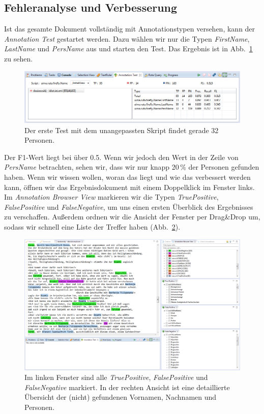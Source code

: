 \documentclass{article}
\begin{document}
\subsection{Fehleranalyse und Verbesserung}

Ist das gesamte Dokument vollständig mit Annotationstypen versehen, kann der \textit{Annotation Test} gestartet werden. Dazu wählen wir nur die Typen \textit{FirstName}, \textit{LastName} und \textit{PersName} aus und starten den Test. Das Ergebnis ist in Abb.~\ref{test_result} zu sehen.

\begin{figure}
\centering
\includegraphics[width=1\textwidth]{figs/test_result.png}
\caption{Der erste Test mit dem unangepassten Skript findet gerade 32 Personen.}
\label{test_result}
\end{figure}

Der F1-Wert liegt bei über 0.5. Wenn wir jedoch den Wert in der Zeile von \textit{PersName} betrachten, sehen wir, dass wir nur knapp 20\,\% der Personen gefunden haben. Wenn wir wissen wollen, woran das liegt und wie das verbessert werden kann, öffnen wir das Ergebnisdokument mit einem Doppelklick im Fenster links. Im \textit{Annotation Browser View} markieren wir die Typen \textit{TruePositive}, \textit{FalsePositive} und \textit{FalseNegative}, um uns einen ersten Überblick des Ergebnisses zu verschaffen. Außerdem ordnen wir die Ansicht der Fenster per Drag\&Drop um, sodass wir schnell eine Liste der Treffer haben (Abb.~\ref{test_view}).

\begin{figure}
\centering
\includegraphics[width=1\textwidth]{figs/test_view.png}
\caption{Im linken Fenster sind alle \textit{TruePositive}, \textit{FalsePositive} und \textit{FalseNegative} markiert. In der rechten Ansicht ist eine detaillierte Übersicht der (nicht) gefundenen Vornamen, Nachnamen und Personen.}
\label{test_view}
\end{figure}
\end{document}
